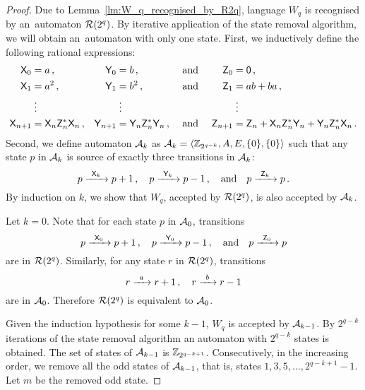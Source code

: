 \begin{proof}
    Due to Lemma~\ref*{lm:W_q_recognised_by_R2q}, language $W_q$ is recognised by an~automaton ${\mathcal{R}}(2^q)$. By iterative application of the state removal algorithm, we will obtain an~automaton with only one state. First, we inductively define the following rational expressions:
    \begin{align*}
        {\mathsf{X}}_0 &= a \, , & {\mathsf{Y}}_0 &= b \, , & &\text{ and } & {\mathsf{Z}}_0 &= {\mathsf{0}} \, , \\
        {\mathsf{X}}_1 &= a^2 \, , & {\mathsf{Y}}_1 &= b^2 \, , & &\text{ and } & {\mathsf{Z}}_1 &= ab+ba \, , \\
        &\; \vdots & &\; \vdots & & & &\; \vdots \\
        {\mathsf{X}}_{n+1} &= {\mathsf{X}}_n {\mathsf{Z}}_n^* {\mathsf{X}}_n \, , & {\mathsf{Y}}_{n+1} &= {\mathsf{Y}}_n {\mathsf{Z}}_n^* {\mathsf{Y}}_n \, , & &\text{ and } & {\mathsf{Z}}_{n+1} &= {\mathsf{Z}}_n + {\mathsf{X}}_n {\mathsf{Z}}_n^* {\mathsf{Y}}_n + {\mathsf{Y}}_n {\mathsf{Z}}_n^* {\mathsf{X}}_n \, .
    \end{align*}
    Second, we define automaton ${\mathcal{A}}_k$ as ${\mathcal{A}}_k = \langle \mathbb{Z}_{2^{q-k}}, A, E, \{0\}, \{0\} \rangle$ such that any state $p$ in ${\mathcal{A}}_k$ is source of exactly three transitions in ${\mathcal{A}}_k$:
    \[
        p {\; \xrightarrow[]{\: \; {\mathsf{X}}_k \: \;} \;} p+1 \, , \quad p {\; \xrightarrow[]{\: \; {\mathsf{Y}}_k \: \;} \;} p-1 \, , \quad \text{and} \quad p {\; \xrightarrow[]{\: \; {\mathsf{Z}}_k \: \;} \;} p \, .
    \]
    By induction on $k$, we show that $W_q$, accepted by ${\mathcal{R}}(2^q)$, is also accepted by ${\mathcal{A}}_k$.

    Let $k = 0$. Note that for each state $p$ in ${\mathcal{A}}_0$, transitions
    \[
        p {\; \xrightarrow[]{\: \; {\mathsf{X}}_0 \: \;} \;} p+1 \, , \quad p {\; \xrightarrow[]{\: \; {\mathsf{Y}}_0 \: \;} \;} p-1 \, , \quad \text{and} \quad p {\; \xrightarrow[]{\: \; {\mathsf{Z}}_0 \: \;} \;} p
    \]
    are in ${\mathcal{R}}(2^q)$. Similarly, for any state $r$ in ${\mathcal{R}}(2^q)$, transitions
    \[
        r {\; \xrightarrow[]{\: \; a \: \;} \;} r+1 \, , \quad r {\; \xrightarrow[]{\: \; b \: \;} \;} r-1
    \]
    are in ${\mathcal{A}}_0$. Therefore ${\mathcal{R}}(2^q)$ is equivalent to ${\mathcal{A}}_0$.

    Given the induction hypothesis for some $k - 1$, $W_q$ is accepted by ${\mathcal{A}}_{k-1}$. By $2^{q-k}$ iterations of the state removal algorithm an automaton with $2^{q-k}$ states is obtained. The set of states of ${\mathcal{A}}_{k-1}$ is $\mathbb{Z}_{2^{q-k+1}}$. Consecutively, in the increasing order, we remove all the odd states of ${\mathcal{A}}_{k-1}$, that is, states $1, 3, 5, \dotsc, 2^{q-k+1}-1$. Let $m$ be the removed odd state.


\end{proof}
